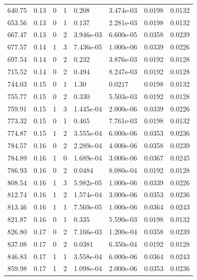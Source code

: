 \documentclass[preview]{standalone}
\begin{document}
{{{\begin{tabular}{L{1.2cm}C{1.2cm} C{0.3cm}C{0.5cm} C{1.4cm}C{1.4cm} C{1.4cm}C{1.4cm}}
  640.75  &  0.13  & 0     &  1 &  0.208  & 3.474e-03  & 0.0198 &  0.0132   \\ 
  653.56  &  0.13  & 0     &  1 &  0.137  & 2.281e-03  & 0.0198 &  0.0132   \\ 
  667.47  &  0.13  & 0     &  2 &  3.946e-03  & 6.600e-05  & 0.0358 &  0.0239   \\ 
  677.57  &  0.14  & 1     &  3 &  7.436e-05  & 1.000e-06  & 0.0339 &  0.0226   \\ 
  697.54  &  0.14  & 0     &  2 &  0.232  & 3.876e-03  & 0.0192 &  0.0128   \\ 
  715.52  &  0.14  & 0     &  2 &  0.494  & 8.247e-03  & 0.0192 &  0.0128   \\ 
  744.03  &  0.15  & 0     &  1 &  1.30  & 0.0217  & 0.0198 &  0.0132   \\ 
  755.77  &  0.15  & 0     &  2 &  0.330  & 5.503e-03  & 0.0192 &  0.0128   \\ 
  759.91  &  0.15  & 1     &  3 &  1.445e-04  & 2.000e-06  & 0.0339 &  0.0226   \\ 
  773.32  &  0.15  & 0     &  1 &  0.465  & 7.761e-03  & 0.0198 &  0.0132   \\ 
  774.87  &  0.15  & 1     &  2 &  3.555e-04  & 6.000e-06  & 0.0353 &  0.0236   \\ 
  784.57  &  0.16  & 0     &  2 &  2.289e-04  & 4.000e-06  & 0.0358 &  0.0239   \\ 
  784.89  &  0.16  & 1     &  0 &  1.689e-04  & 3.000e-06  & 0.0367 &  0.0245   \\ 
  786.93  &  0.16  & 0     &  2 &  0.0484  & 8.080e-04  & 0.0192 &  0.0128   \\ 
  808.54  &  0.16  & 1     &  3 &  5.982e-05  & 1.000e-06  & 0.0339 &  0.0226   \\ 
  812.74  &  0.16  & 1     &  2 &  1.574e-04  & 3.000e-06  & 0.0353 &  0.0236   \\ 
  813.46  &  0.16  & 1     &  1 &  7.569e-05  & 1.000e-06  & 0.0364 &  0.0243   \\ 
  821.87  &  0.16  & 0     &  1 &  0.335  & 5.590e-03  & 0.0198 &  0.0132   \\ 
  826.80  &  0.17  & 0     &  2 &  7.166e-03  & 1.200e-04  & 0.0358 &  0.0239   \\ 
  837.08  &  0.17  & 0     &  2 &  0.0381  & 6.350e-04  & 0.0192 &  0.0128   \\ 
  846.83  &  0.17  & 1     &  1 &  3.558e-04  & 6.000e-06  & 0.0364 &  0.0243   \\ 
  859.98  &  0.17  & 1     &  2 &  1.098e-04  & 2.000e-06  & 0.0353 &  0.0236   \\ 

\end{tabular}}}}
\end{document}
